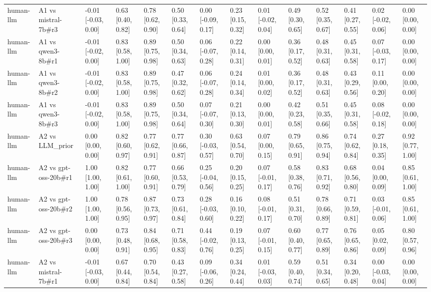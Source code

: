 \begin{table}
{\begin{tabular}{llllllllllllll}
human-llm & A1 vs mistral-7b\#r3 & -0.01 [-0.03, 0.00] & 0.63 [0.40, 0.82] & 0.78 [0.62, 0.90] & 0.50 [0.33, 0.64] & 0.00 [-0.09, 0.17] & 0.23 [0.15, 0.32] & 0.01 [-0.02, 0.04] & 0.49 [0.30, 0.65] & 0.52 [0.35, 0.67] & 0.41 [0.27, 0.55] & 0.02 [-0.02, 0.06] & 0.00 [0.00, 0.00] \\
human-llm & A1 vs qwen3-8b\#r1 & -0.01 [-0.02, 0.00] & 0.83 [0.58, 1.00] & 0.89 [0.75, 0.98] & 0.50 [0.34, 0.63] & 0.06 [-0.07, 0.28] & 0.22 [0.14, 0.31] & 0.00 [0.00, 0.01] & 0.36 [0.17, 0.52] & 0.48 [0.31, 0.63] & 0.45 [0.31, 0.58] & 0.07 [-0.03, 0.17] & 0.00 [0.00, 0.00] \\
human-llm & A1 vs qwen3-8b\#r2 & -0.01 [-0.02, 0.00] & 0.83 [0.58, 1.00] & 0.89 [0.75, 0.98] & 0.47 [0.32, 0.62] & 0.06 [-0.07, 0.28] & 0.24 [0.14, 0.34] & 0.01 [0.00, 0.02] & 0.36 [0.17, 0.52] & 0.48 [0.31, 0.63] & 0.43 [0.29, 0.56] & 0.11 [0.00, 0.20] & 0.00 [0.00, 0.00] \\
human-llm & A1 vs qwen3-8b\#r3 & -0.01 [-0.02, 0.00] & 0.83 [0.58, 1.00] & 0.89 [0.75, 0.98] & 0.50 [0.34, 0.64] & 0.07 [-0.07, 0.30] & 0.21 [0.13, 0.30] & 0.00 [0.00, 0.01] & 0.42 [0.23, 0.58] & 0.51 [0.35, 0.66] & 0.45 [0.31, 0.58] & 0.08 [-0.02, 0.18] & 0.00 [0.00, 0.00] \\
human-llm & A2 vs LLM\_prior & 0.00 [0.00, 0.00] & 0.82 [0.60, 0.97] & 0.77 [0.62, 0.91] & 0.77 [0.66, 0.87] & 0.30 [-0.03, 0.57] & 0.63 [0.54, 0.70] & 0.07 [0.00, 0.15] & 0.79 [0.65, 0.91] & 0.86 [0.75, 0.94] & 0.74 [0.62, 0.84] & 0.27 [0.18, 0.35] & 0.92 [0.77, 1.00] \\
human-llm & A2 vs gpt-oss-20b\#r1 & 1.00 [1.00, 1.00] & 0.82 [0.61, 1.00] & 0.77 [0.60, 0.91] & 0.66 [0.53, 0.79] & 0.25 [-0.04, 0.56] & 0.20 [0.15, 0.25] & 0.07 [-0.01, 0.17] & 0.58 [0.38, 0.76] & 0.83 [0.71, 0.92] & 0.68 [0.56, 0.80] & 0.04 [0.00, 0.09] & 0.85 [0.61, 1.00] \\
human-llm & A2 vs gpt-oss-20b\#r2 & 1.00 [1.00, 1.00] & 0.78 [0.56, 0.95] & 0.87 [0.73, 0.97] & 0.73 [0.61, 0.84] & 0.28 [-0.03, 0.60] & 0.16 [0.10, 0.22] & 0.08 [-0.01, 0.17] & 0.51 [0.31, 0.70] & 0.78 [0.66, 0.89] & 0.71 [0.59, 0.81] & 0.03 [-0.01, 0.06] & 0.85 [0.61, 1.00] \\
human-llm & A2 vs gpt-oss-20b\#r3 & 0.00 [0.00, 0.00] & 0.73 [0.48, 0.91] & 0.84 [0.68, 0.95] & 0.71 [0.58, 0.83] & 0.44 [-0.02, 0.76] & 0.19 [0.13, 0.25] & 0.07 [-0.01, 0.15] & 0.60 [0.40, 0.77] & 0.77 [0.65, 0.89] & 0.76 [0.65, 0.86] & 0.05 [0.02, 0.09] & 0.80 [0.57, 0.96] \\
human-llm & A2 vs mistral-7b\#r1 & -0.01 [-0.03, 0.00] & 0.67 [0.44, 0.84] & 0.70 [0.54, 0.84] & 0.43 [0.27, 0.58] & 0.09 [-0.06, 0.26] & 0.34 [0.24, 0.44] & 0.01 [-0.03, 0.03] & 0.59 [0.40, 0.74] & 0.51 [0.34, 0.65] & 0.34 [0.20, 0.48] & 0.00 [-0.03, 0.04] & 0.00 [0.00, 0.00] \\

\end{tabular}}
\end{table}
